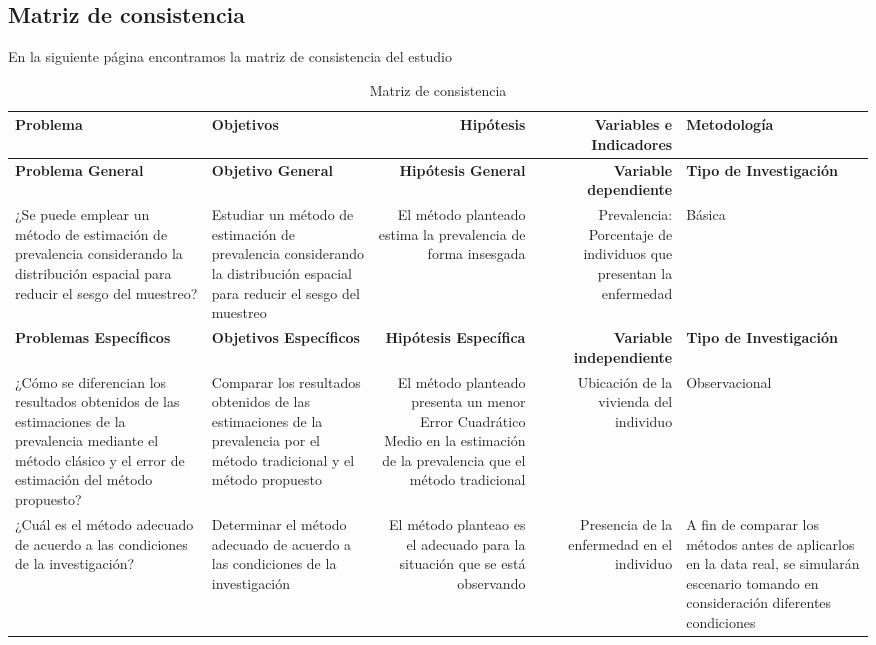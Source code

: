 \subsection{Matriz de consistencia}
En la siguiente página encontramos la matriz de consistencia del estudio
\newpage
\begin{landscape}

\begin{table}[htbp]
  \centering
  \caption{Matriz de consistencia}
    \begin{tabular}{|p{11.07em}|p{11.07em}|r|r|p{11.07em}|}
    \toprule
    \textbf{Problema} & \textbf{Objetivos} & \multicolumn{1}{p{11.07em}|}{\textbf{Hipótesis}} & \multicolumn{1}{p{11.07em}|}{\textbf{Variables e Indicadores}} & \textbf{Metodología} \\
    \midrule
    \textbf{Problema General} & \textbf{Objetivo General} & \multicolumn{1}{p{11.07em}|}{\textbf{Hipótesis General}} & \multicolumn{1}{p{11.07em}|}{\textbf{Variable dependiente}} & \textbf{Tipo de Investigación} \\
    ¿Se puede emplear un método de estimación de prevalencia considerando la distribución espacial para reducir el sesgo del muestreo? & Estudiar un método de estimación de prevalencia considerando la distribución espacial para reducir el sesgo del muestreo & \multicolumn{1}{p{11.07em}|}{El método planteado estima la prevalencia de forma insesgada} & \multicolumn{1}{p{11.07em}|}{Prevalencia: Porcentaje de individuos que presentan la enfermedad} & Básica \\
    \textbf{Problemas Específicos} & \textbf{Objetivos Específicos} & \multicolumn{1}{p{11.07em}|}{\textbf{Hipótesis Específica}} & \multicolumn{1}{p{11.07em}|}{\textbf{Variable independiente}} & \textbf{Tipo de Investigación} \\
    ¿Cómo se diferencian los resultados obtenidos de las estimaciones de la prevalencia mediante el método clásico y el error de estimación del método propuesto? & Comparar los resultados obtenidos de las estimaciones de la prevalencia por el método tradicional y el método propuesto & \multicolumn{1}{p{11.07em}|}{El método planteado presenta un menor Error Cuadrático Medio en la estimación de la prevalencia que el método tradicional} & \multicolumn{1}{p{11.07em}|}{Ubicación de la vivienda del individuo} & Observacional \\
    ¿Cuál es el método adecuado de acuerdo a las condiciones de la investigación? & Determinar el método adecuado de acuerdo a las condiciones de la investigación & \multicolumn{1}{p{11.07em}|}{El método planteao es el adecuado para la situación que se está observando} & \multicolumn{1}{p{11.07em}|}{Presencia de la enfermedad en el individuo} & A fin de comparar los métodos antes de aplicarlos en la data real, se simularán escenario tomando en consideración diferentes condiciones \\

\end{tabular}
\end{table}
\end{landscape}
